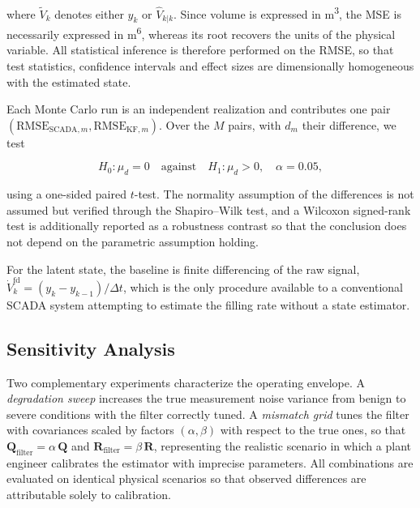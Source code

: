 \documentclass[conference]{IEEEtran}
\begin{document}
where $\tilde{V}_{k}$ denotes either $y_{k}$ or $\hat{V}_{k|k}$. Since volume is
expressed in m\textsuperscript{3}, the MSE is necessarily expressed in
m\textsuperscript{6}, whereas its root recovers the units of the physical
variable. All statistical inference is therefore performed on the RMSE, so that
test statistics, confidence intervals and effect sizes are dimensionally
homogeneous with the estimated state.

Each Monte Carlo run is an independent realization and contributes one pair
$(\mathrm{RMSE}_{\text{SCADA},m}, \mathrm{RMSE}_{\text{KF},m})$. Over the $M$
pairs, with $d_{m}$ their difference, we test

\begin{equation}
H_{0}: \mu_{d} = 0 \quad \text{against} \quad H_{1}: \mu_{d} > 0,
\quad \alpha = 0.05,
\label{eq:hypothesis}
\end{equation}

using a one-sided paired $t$-test. The normality assumption of the differences
is not assumed but verified through the Shapiro--Wilk test, and a Wilcoxon
signed-rank test is additionally reported as a robustness contrast so that the
conclusion does not depend on the parametric assumption holding.

For the latent state, the baseline is finite differencing of the raw signal,
$\dot{V}^{\text{fd}}_{k} = (y_{k} - y_{k-1})/\Delta t$, which is the only
procedure available to a conventional SCADA system attempting to estimate the
filling rate without a state estimator.

\subsection{Sensitivity Analysis}

Two complementary experiments characterize the operating envelope. A
\emph{degradation sweep} increases the true measurement noise variance from
benign to severe conditions with the filter correctly tuned. A \emph{mismatch
grid} tunes the filter with covariances scaled by factors $(\alpha, \beta)$ with
respect to the true ones, so that
$\mathbf{Q}_{\text{filter}} = \alpha\,\mathbf{Q}$ and
$\mathbf{R}_{\text{filter}} = \beta\,\mathbf{R}$, representing the realistic
scenario in which a plant engineer calibrates the estimator with imprecise
parameters. All combinations are evaluated on identical physical scenarios so
that observed differences are attributable solely to calibration.

\end{document}
